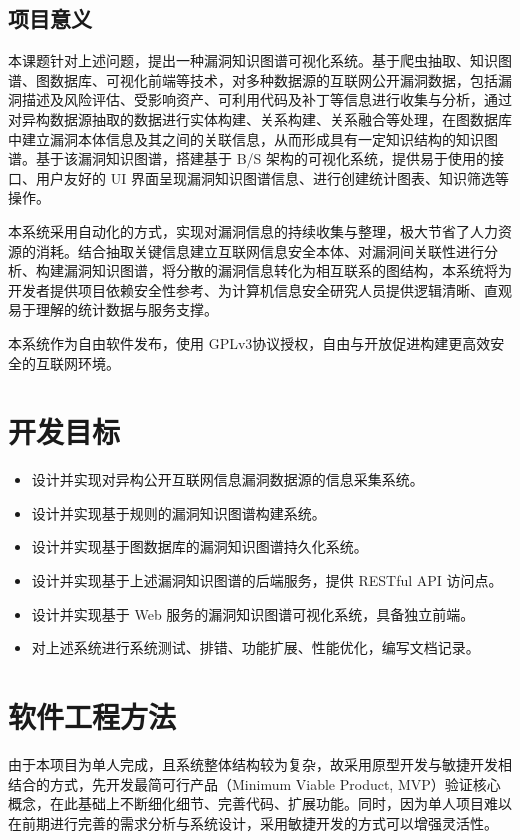 \documentclass[a4paper,AutoFakeBold,oneside,12pt]{book}
\begin{document}
\subsection{项目意义}

本课题针对上述问题，提出一种漏洞知识图谱可视化系统。基于爬虫抽取、知识图谱、图数据库、可视化前端等技术，对多种数据源的互联网公开漏洞数据，包括漏洞描述及风险评估、受影响资产、可利用代码及补丁等信息进行收集与分析，通过对异构数据源抽取的数据进行实体构建、关系构建、关系融合等处理，在图数据库中建立漏洞本体信息及其之间的关联信息，从而形成具有一定知识结构的知识图谱。基于该漏洞知识图谱，搭建基于 B/S 架构的可视化系统，提供易于使用的接口、用户友好的 UI 界面呈现漏洞知识图谱信息、进行创建统计图表、知识筛选等操作。

本系统采用自动化的方式，实现对漏洞信息的持续收集与整理，极大节省了人力资源的消耗。结合抽取关键信息建立互联网信息安全本体、对漏洞间关联性进行分析、构建漏洞知识图谱，将分散的漏洞信息转化为相互联系的图结构，本系统将为开发者提供项目依赖安全性参考、为计算机信息安全研究人员提供逻辑清晰、直观易于理解的统计数据与服务支撑。

本系统作为自由软件\cite{libre_software}发布，使用 GPLv3\cite{gpl_v3}协议授权，自由与开放促进构建更高效安全的互联网环境。

\section{开发目标}

\begin{itemize}
	\item 设计并实现对异构公开互联网信息漏洞数据源的信息采集系统。
	\item 设计并实现基于规则的漏洞知识图谱构建系统。
	\item 设计并实现基于图数据库的漏洞知识图谱持久化系统。
	\item 设计并实现基于上述漏洞知识图谱的后端服务，提供 RESTful API 访问点。
	\item 设计并实现基于 Web 服务的漏洞知识图谱可视化系统，具备独立前端。
	\item 对上述系统进行系统测试、排错、功能扩展、性能优化，编写文档记录。
\end{itemize}

\section{软件工程方法}

由于本项目为单人完成，且系统整体结构较为复杂，故采用原型开发与敏捷开发\cite{manifesto_agile_dev}相结合的方式，先开发最简可行产品\cite{minimum_viable_product}（Minimum Viable Product, MVP）验证核心概念，在此基础上不断细化细节、完善代码、扩展功能。同时，因为单人项目难以在前期进行完善的需求分析与系统设计，采用敏捷开发的方式可以增强灵活性。
\end{document}
